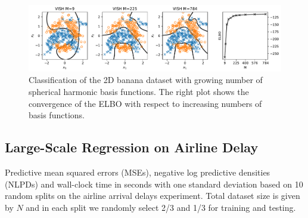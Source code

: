 
\begin{figure}[tbh]
    \centering
    \includegraphics[width=\textwidth]{banana}
    \caption{Classification of the 2D banana dataset with growing number of spherical harmonic basis functions. The right plot shows the convergence of the ELBO with respect to increasing numbers of basis functions.\label{fig:banana}}
\end{figure}



\subsection{Large-Scale Regression on Airline Delay}
 
\begin{table}[tb]
\centering
\resizebox{\textwidth}{!}{ }
\caption{Predictive mean squared errors (MSEs), negative log predictive densities (NLPDs) and wall-clock time in seconds with one standard deviation based on 10 random splits on the airline arrival delays experiment. Total dataset size is given by $N$ and in each split we randomly select 2/3 and 1/3 for training and testing.}
\label{tab:airline}
\end{table}


